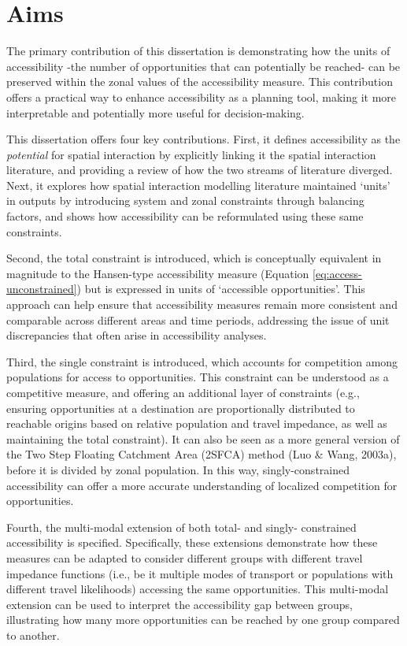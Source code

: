 \documentclass[
11pt, %
oneside, %
english, %
singlespacing, %
]{macthesis} %
\begin{document}
\section{Aims}\label{aims}

The primary contribution of this dissertation is demonstrating how the units of accessibility -the number of opportunities that can potentially be reached- can be preserved within the zonal values of the accessibility measure. This contribution offers a practical way to enhance accessibility as a planning tool, making it more interpretable and potentially more useful for decision-making.

This dissertation offers four key contributions. First, it defines accessibility as the \emph{potential} for spatial interaction by explicitly linking it the spatial interaction literature, and providing a review of how the two streams of literature diverged. Next, it explores how spatial interaction modelling literature maintained `units' in outputs by introducing system and zonal constraints through balancing factors, and shows how accessibility can be reformulated using these same constraints.

Second, the total constraint is introduced, which is conceptually equivalent in magnitude to the Hansen-type accessibility measure (Equation \ref{eq:access-unconstrained}) but is expressed in units of `accessible opportunities'. This approach can help ensure that accessibility measures remain more consistent and comparable across different areas and time periods, addressing the issue of unit discrepancies that often arise in accessibility analyses.

Third, the single constraint is introduced, which accounts for competition among populations for access to opportunities. This constraint can be understood as a competitive measure, and offering an additional layer of constraints (e.g., ensuring opportunities at a destination are proportionally distributed to reachable origins based on relative population and travel impedance, as well as maintaining the total constraint). It can also be seen as a more general version of the Two Step Floating Catchment Area (2SFCA) method (Luo \& Wang, 2003a), before it is divided by zonal population. In this way, singly-constrained accessibility can offer a more accurate understanding of localized competition for opportunities.

Fourth, the multi-modal extension of both total- and singly- constrained accessibility is specified. Specifically, these extensions demonstrate how these measures can be adapted to consider different groups with different travel impedance functions (i.e., be it multiple modes of transport or populations with different travel likelihoods) accessing the same opportunities. This multi-modal extension can be used to interpret the accessibility gap between groups, illustrating how many more opportunities can be reached by one group compared to another.
\end{document}
